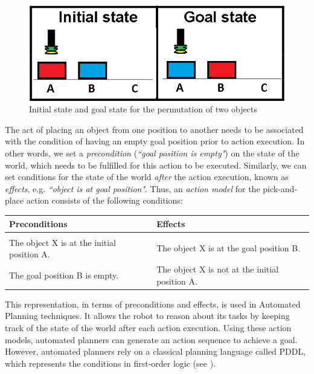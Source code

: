 \begin{figure}[h]
	\centering
	\includegraphics[scale=0.35]{figures/PbD-permutation}
	\caption{Initial state and goal state for the permutation of two objects}
	\label{fig:Permutation}
\end{figure}

The act of placing an object from one position to another needs to be associated with the condition of having an empty goal position prior to action execution.
In other words, we set a \textit{precondition} (\textit{``goal position is empty"}) on the state of the world, which needs to be fulfilled for this action to be executed.
Similarly, we can set conditions for the state of the world \textit{after} the action execution, known as \textit{effects}, e.g. \textit{``object is at goal position"}.
Thus, an \textit{action model} for the pick-and-place action consists of the following conditions:

\begin{table}[h]
	\begin{center}
		\begin{tabular}{l|l}
			Preconditions & Effects\\ \hline
			& \\
			The object X is at the initial position A.
			& The object X is at the goal position B.\\
			The goal position B is empty.
			& The object X is not at the initial position A.
		\end{tabular}
	\end{center}
	\label{tab:conditions}
\end{table}

This representation, in terms of preconditions and effects, is used in Automated Planning techniques.
It allows the robot to reason about its tasks by keeping track of the state of the world after each action execution.
Using these action models, automated planners can generate an action sequence to achieve a goal.
However, automated planners rely on a classical planning language called PDDL, which represents the conditions in first-order logic (see ).


